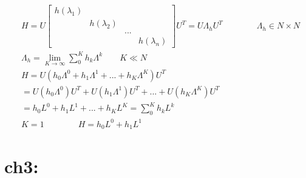 \documentclass{article}
\begin{document}
%
\begin{align*}
    & H = U 
        \begin{bmatrix}
            h(\lambda_{1})  &  &  &  \\
            &  h(\lambda_{2})  &  &  \\
            &  &  ...  &  \\
            &  &  &  h(\lambda_{n})
        \end{bmatrix}
        U^{T} 
        = U \Lambda_{h} U^{T} \qquad \qquad 
        \Lambda_{h} \in N \times N  \\[3pt]
    & \Lambda_{h} = \lim_{K \to \infty} \sum_{0}^{K} h_{k} \Lambda^{k} \qquad K \ll N  \\[3pt]
    & H = U ( h_{0} \Lambda^{0} + h_{1} \Lambda^{1} + ... + h_{K} \Lambda^{K} ) U^{T}  \\[3pt]
    &   = U ( h_{0} \Lambda^{0} ) U^{T} + 
          U ( h_{1} \Lambda^{1} ) U^{T} + 
          ... + 
          U ( h_{K} \Lambda^{K} ) U^{T}  \\[3pt]
    &   = h_{0} L^{0} + h_{1} L^{1} + ... + h_{K} L^{K} 
        = \sum_{0}^{K} h_{k} L^{k}  \\[3pt]
    & K = 1 \qquad \qquad H = h_{0} L^{0} + h_{1} L^{1} 
\end{align*}


\newpage
\section*{ch3: }
\end{document}
